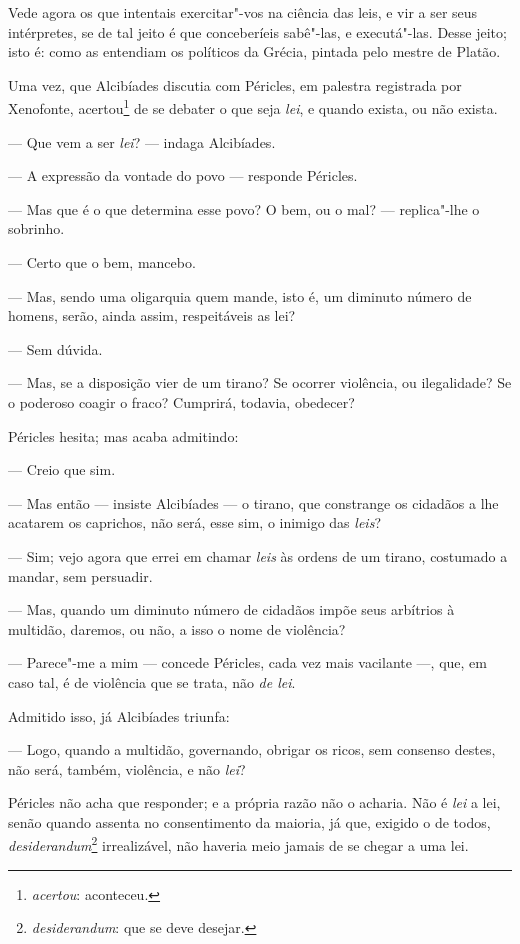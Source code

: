 Vede agora os que intentais exercitar"-vos na ciência das leis, e
vir a ser seus intérpretes, se de tal jeito é que conceberíeis
sabê"-las, e executá"-las. Desse jeito; isto é: como as entendiam os
políticos da Grécia, pintada pelo mestre de Platão.

Uma vez, que Alcibíades discutia com Péricles, em palestra
registrada por Xenofonte, acertou\footnote{
\textit{acertou}: aconteceu.} de se debater o que seja \textit{lei}, e
quando exista, ou não exista.

--- Que vem a ser \textit{lei}? --- indaga Alcibíades.

--- A expressão da vontade do povo --- responde
Péricles.

--- Mas que é o que determina esse povo? O bem, ou o
mal? --- replica"-lhe o sobrinho.

--- Certo que o bem, mancebo.

--- Mas, sendo uma oligarquia quem mande, isto é, um
diminuto número de homens, serão, ainda assim, respeitáveis as lei?

--- Sem dúvida.

--- Mas, se a disposição vier de um tirano? Se ocorrer
violência, ou ilegalidade? Se o poderoso coagir o fraco? Cumprirá,
todavia, obedecer? 

Péricles hesita; mas acaba admitindo:

--- Creio que sim.

--- Mas então --- insiste Alcibíades --- o tirano, que constrange 
os cidadãos a lhe acatarem os caprichos, não será, esse sim, 
o inimigo das \textit{leis}?

--- Sim; vejo agora que errei em chamar \textit{leis} às
ordens de um tirano, costumado a mandar, sem persuadir.

--- Mas, quando um diminuto número de cidadãos impõe seus
arbítrios à multidão, daremos, ou não, a isso o nome de violência?

--- Parece"-me a mim --- concede Péricles, cada vez mais
vacilante ---, que, em caso tal, é de violência que se
trata, não \textit{de lei}.

Admitido isso, já Alcibíades triunfa:

--- Logo, quando a multidão, governando, obrigar os ricos,
sem consenso destes, não será, também, violência, e não
\textit{lei}?

Péricles não acha que responder; e a própria
razão não o acharia. Não é \textit{lei} a lei, senão quando assenta no
consentimento da maioria, já que, exigido o de todos,
\textit{desiderandum}\footnote{ \textit{desiderandum}: que se deve
desejar.} irrealizável, não haveria meio jamais de se chegar a uma lei.

